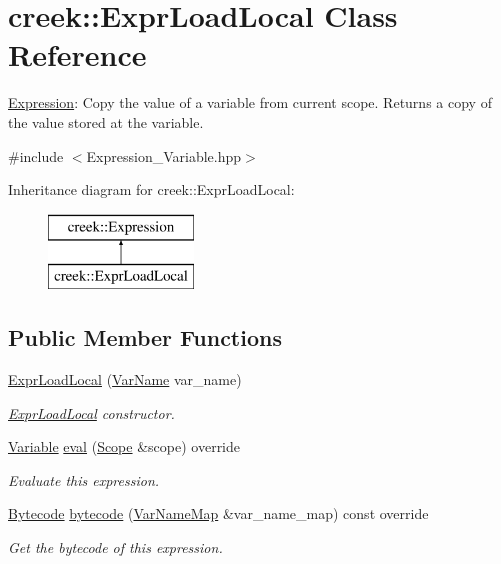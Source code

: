 \hypertarget{classcreek_1_1_expr_load_local}{}\section{creek\+:\+:Expr\+Load\+Local Class Reference}
\label{classcreek_1_1_expr_load_local}


\hyperlink{classcreek_1_1_expression}{Expression}\+: Copy the value of a variable from current scope. Returns a copy of the value stored at the variable.  




{\ttfamily \#include $<$Expression\+\_\+\+Variable.\+hpp$>$}

Inheritance diagram for creek\+:\+:Expr\+Load\+Local\+:\begin{figure}[H]
\begin{center}
\leavevmode
\includegraphics[height=2.000000cm]{classcreek_1_1_expr_load_local}
\end{center}
\end{figure}
\subsection*{Public Member Functions}
\begin{DoxyCompactItemize}
\item 
\hyperlink{classcreek_1_1_expr_load_local_a076d88eea2fc081b733faaf93fe97726}{Expr\+Load\+Local} (\hyperlink{classcreek_1_1_var_name}{Var\+Name} var\+\_\+name)
\begin{DoxyCompactList}\small\item\em {\ttfamily \hyperlink{classcreek_1_1_expr_load_local}{Expr\+Load\+Local}} constructor. \end{DoxyCompactList}\item 
\hyperlink{classcreek_1_1_variable}{Variable} \hyperlink{classcreek_1_1_expr_load_local_a0967bafe453441742d9469501388bb06}{eval} (\hyperlink{classcreek_1_1_scope}{Scope} \&scope) override
\begin{DoxyCompactList}\small\item\em Evaluate this expression. \end{DoxyCompactList}\item 
\hyperlink{classcreek_1_1_bytecode}{Bytecode} \hyperlink{classcreek_1_1_expr_load_local_afaa05297607d09b0c8b69df84474eb02}{bytecode} (\hyperlink{classcreek_1_1_var_name_map}{Var\+Name\+Map} \&var\+\_\+name\+\_\+map) const  override\hypertarget{classcreek_1_1_expr_load_local_afaa05297607d09b0c8b69df84474eb02}{}\label{classcreek_1_1_expr_load_local_afaa05297607d09b0c8b69df84474eb02}

\begin{DoxyCompactList}\small\item\em Get the bytecode of this expression. \end{DoxyCompactList}\end{DoxyCompactItemize}


